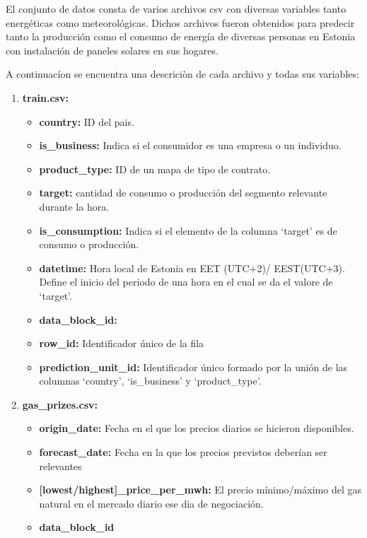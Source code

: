 \documentclass[a4paper,12pt]{article}
\begin{document}
El conjunto de datos consta de varios archivos csv
con diversas variables tanto energéticas como 
meteorológicas. Dichos archivos fueron obtenidos 
para predecir tanto la producción como el consumo
de energía de diversas personas en Estonia con 
instalación de paneles solares en sus hogares.

A continuacíon se encuentra una descriciòn de 
cada archivo y todas sus variables:

\begin{enumerate}
    \item \textbf{train.csv:}
    \begin{itemize}
        \item \textbf{country:} 
        ID del pais.
        \item \textbf{is\_business:}
        Indica si el consumidor es una empresa o
        un individuo.
        \item \textbf{product\_type:}
        ID de un mapa de tipo de contrato.
        \item \textbf{target:} 
        cantidad de consumo o producción del 
        segmento relevante durante la hora. 
        \item \textbf{is\_consumption:}
        Indica si el elemento de la columna 
        `target' es de consumo o producción.
        \item \textbf{datetime:}
        Hora local de Estonia en EET (UTC+2)/
        EEST(UTC+3). Define el inicio del periodo
        de una hora en el cual se da el valore de 
        `target'.
        \item \textbf{data\_block\_id:}
        
        \item \textbf{row\_id:}
        Identificador único de la fila
        \item \textbf{prediction\_unit\_id:}
        Identificador único formado por la unión de
        las columnas `country', `is\_business' y 
        `product\_type'.
    \end{itemize}
    
    \item \textbf{gas\_prizes.csv:}
    \begin{itemize}
        \item \textbf{origin\_date:}
        Fecha en el que los precios diarios
        se hicieron disponibles.
        \item \textbf{forecast\_date:}
        Fecha en la que los precios previstos
        deberían ser relevantes
        \item \textbf{[lowest/highest]\_price\_per\_mwh:}
        El precio mínimo/máximo del gas natural en el 
        mercado diario ese dia de negociación.
        \item \textbf{data\_block\_id}
    \end{itemize}


\end{enumerate}
\end{document}
